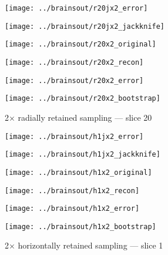 \documentclass[review,supplement,onefignum,onetabnum,juq]{siamonline181217}
\begin{document}
\begin{figure}
\begin{centering}

\parbox{\imsize}{\texttt{[image: ../brainsout/r20jx2\_error]}}
\parbox{\imsize}{\texttt{[image: ../brainsout/r20jx2\_jackknife]}}

\vspace{\vertsep}

\parbox{\imsize}{\texttt{[image: ../brainsout/r20x2\_original]}}
\parbox{\imsize}{\texttt{[image: ../brainsout/r20x2\_recon]}}

\vspace{\vertsep}

\parbox{\imsize}{\texttt{[image: ../brainsout/r20x2\_error]}}
\parbox{\imsize}{\texttt{[image: ../brainsout/r20x2\_bootstrap]}}

\end{centering}
\caption{2$\times$ radially retained sampling --- slice 20}
\end{figure}


\begin{figure}
\begin{centering}

\parbox{\imsize}{\texttt{[image: ../brainsout/h1jx2\_error]}}
\parbox{\imsize}{\texttt{[image: ../brainsout/h1jx2\_jackknife]}}

\vspace{\vertsep}

\parbox{\imsize}{\texttt{[image: ../brainsout/h1x2\_original]}}
\parbox{\imsize}{\texttt{[image: ../brainsout/h1x2\_recon]}}

\vspace{\vertsep}

\parbox{\imsize}{\texttt{[image: ../brainsout/h1x2\_error]}}
\parbox{\imsize}{\texttt{[image: ../brainsout/h1x2\_bootstrap]}}

\end{centering}
\caption{2$\times$ horizontally retained sampling --- slice 1}
\end{figure}
\end{document}
